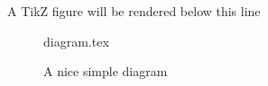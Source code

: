 \documentclass[class=article, crop=false]{standalone}
\begin{document}
A TikZ figure will be rendered below this line

\begin{figure}[ht]
\centering
{diagram.tex}
\label{fig:tikzexample}
\caption{A nice simple diagram}
\end{figure}

\blindtext
\end{document}

